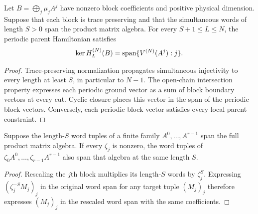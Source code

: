 \begin{lemma}
    \label{thm:ph_block_periodic_closure_tp}
    \leanok
    Let $B=\bigoplus_j\mu_j A^j$ have nonzero block coefficients and positive
    physical dimension. Suppose that each block is trace preserving and
    that the simultaneous words of length $S>0$ span the product matrix
    algebra. For every $S+1\leq L\leq N$, the periodic parent Hamiltonian
    satisfies
    \begin{align}
        \ker H_L^{(N)}(B)=\operatorname{span}\{V^{(N)}(A^j):j\}.
        \notag
    \end{align}
\end{lemma}
\begin{proof}
    \leanok
    Trace-preserving normalization propagates simultaneous injectivity to
    every length at least $S$, in particular to $N-1$. The open-chain
    intersection property expresses each periodic ground vector as a sum
    of block boundary vectors at every cut. Cyclic closure places this
    vector in the span of the periodic block vectors. Conversely, each
    periodic block vector satisfies every local parent constraint.
\end{proof}

\begin{lemma}
    \label{thm:block_word_span_independent_rescaling}
    \leanok
    Suppose the length-$S$ word tuples of a finite family $A^0,\ldots,A^{r-1}$
    span the full product matrix algebra. If every $\zeta_j$ is nonzero,
    the word tuples of $\zeta_0A^0,\ldots,\zeta_{r-1}A^{r-1}$ also span that
    algebra at the same length $S$.
\end{lemma}
\begin{proof}\leanok
    Rescaling the $j$th block multiplies its length-$S$ words by
    $\zeta_j^S$. Expressing $(\zeta_j^{-S}M_j)_j$ in the original word span
    for any target tuple $(M_j)_j$ therefore expresses $(M_j)_j$ in the
    rescaled word span with the same coefficients.
\end{proof}

